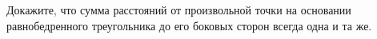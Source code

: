 \begin{ex}
	\begin{condition}
		Докажите, что сумма расстояний от произвольной точки на основании равнобедренного треугольника до его боковых сторон всегда одна и та же.
	\end{condition}
\end{ex}